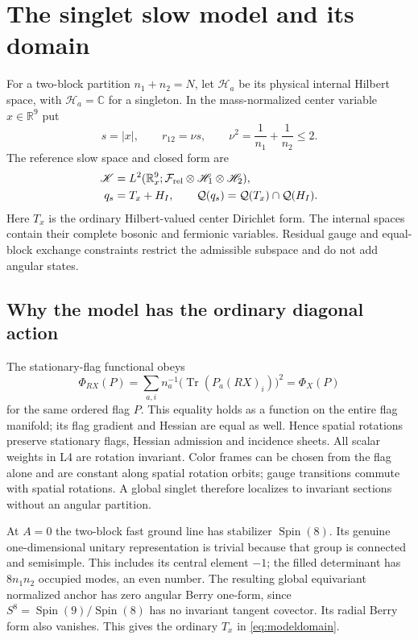 \documentclass[11pt,letterpaper]{article}
\theoremstyle{definition}\newtheorem{hypothesis}[theorem]{Hypothesis}
\newcommand{\Tr}{\operatorname{Tr}}
\newcommand{\QQ}{\mathcal Q}
\newcommand{\FF}{\mathcal F}
\numberwithin{equation}{section}
\begin{document}
\section{The singlet slow model and its domain}\label{sec:singletmodel}
For a two-block partition $n_1+n_2=N$, let $\mathscr H_a$ be its physical internal Hilbert space, with $\mathscr H_a=\mathbb C$ for a singleton. In the mass-normalized center variable $x\in\mathbb R^9$ put
\begin{equation}
 s=|x|,\qquad r_{12}=\nu s,\qquad
 \nu^2=\frac1{n_1}+\frac1{n_2}\le2.
\end{equation}
The reference slow space and closed form are
\begin{align}
 \mathscr K&=L^2(\mathbb R_x^9;
 \FF_{\rm rel}\otimes\mathscr H_1\otimes\mathscr H_2),\\
 q_s&=T_x+H_I,\qquad
 \QQ(q_s)=\QQ(T_x)\cap\QQ(H_I).\label{eq:modeldomain}
\end{align}
Here $T_x$ is the ordinary Hilbert-valued center Dirichlet form. The internal spaces contain their complete bosonic and fermionic variables. Residual gauge and equal-block exchange constraints restrict the admissible subspace and do not add angular states.

\subsection{Why the model has the ordinary diagonal action}
The stationary-flag functional obeys
\begin{equation}
 \Phi_{RX}(P)=\sum_{a,i}n_a^{-1}\bigl(\Tr(P_a(RX)_i)\bigr)^2
 =\Phi_X(P)
\end{equation}
for the same ordered flag $P$. This equality holds as a function on the entire flag manifold; its flag gradient and Hessian are equal as well. Hence spatial rotations preserve stationary flags, Hessian admission and incidence sheets. All scalar weights in L4 are rotation invariant. Color frames can be chosen from the flag alone and are constant along spatial rotation orbits; gauge transitions commute with spatial rotations. A global singlet therefore localizes to invariant sections without an angular partition.

At $A=0$ the two-block fast ground line has stabilizer $\operatorname{Spin}(8)$. Its genuine one-dimensional unitary representation is trivial because that group is connected and semisimple. This includes its central element $-1$; the filled determinant has $8n_1n_2$ occupied modes, an even number. The resulting global equivariant normalized anchor has zero angular Berry one-form, since $S^8=\operatorname{Spin}(9)/\operatorname{Spin}(8)$ has no invariant tangent covector. Its radial Berry form also vanishes. This gives the ordinary $T_x$ in \eqref{eq:modeldomain}.
\end{document}
